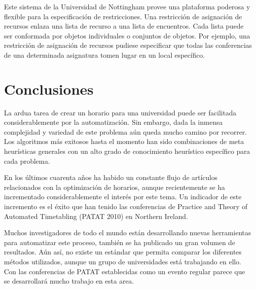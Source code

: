 Este sistema de la Universidad de Nottingham provee una plataforma poderosa y flexible para la especificación de restricciones. Una restricción de asignación de recursos enlaza una lista de recurso a una lista de encuentros. Cada lista puede ser conformada por objetos individuales o conjuntos de objetos. Por ejemplo, una restricción de asignación de recursos pudiese especificar que todas las conferencias de una determinada asignatura tomen lugar en un local específico.

\section{Conclusiones}

La ardua tarea de crear un horario para una universidad puede ser facilitada considerablemente por la automatización. Sin embargo, dada la inmensa complejidad y variedad de este problema aún queda mucho camino por recorrer. Los algoritmos más exitosos hasta el momento han sido combinaciones de meta heurísticas generales con un alto grado de conocimiento heurístico específico para cada problema.

En los últimos cuarenta años ha habido un constante flujo de artículos relacionados con la optimización de horarios, aunque recientemente se ha incrementado considerablemente el inter\'es por este tema. Un indicador de este incremento es el \'exito que han tenido las conferencias de Practice and Theory of Automated Timetabling (PATAT 2010) en Northern Ireland.

Muchos investigadores de todo el mundo están desarrollando nuevas herramientas para automatizar este proceso, tambi\'en se ha publicado un gran volumen de resultados. Aún así, no existe un estándar que permita comparar los diferentes m\'etodos utilizados, aunque un grupo de universidades está trabajando en ello. Con las conferencias de PATAT establecidas como un evento regular parece que se desarrollará mucho trabajo en esta area.